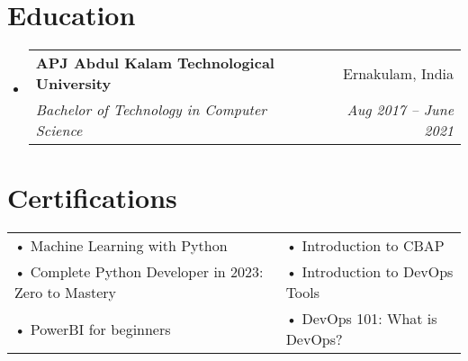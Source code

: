 \documentclass[letterpaper,10pt]{article}
\makeatletter
\newcommand{\resumeItem}[1]{\item\small{#1}}
\newcommand{\resumeSubheading}[4]{
\vspace{-1pt}\item
  \begin{tabular*}{0.97\textwidth}[t]{l@{\extracolsep{\fill}}r}
    \textbf{#1} & #2 \\
    \textit{#3} & \textit{#4} \\
  \end{tabular*}\vspace{-7pt}
}
\newcommand{\resumeSubHeadingList}{\begin{itemize}[leftmargin=0.15in, label={}]}
\newcommand{\resumeSubHeadingListEnd}{\end{itemize}}
\makeatother
\begin{document}
\section{Education}
\resumeSubHeadingList
\resumeSubheading
{APJ Abdul Kalam Technological University}{Ernakulam, India}
{Bachelor of Technology in Computer Science}{Aug 2017 -- June 2021}
\resumeSubHeadingListEnd


\section{Certifications}
\begin{tabular}{p{10cm}p{10cm}}
  • Machine Learning with Python                       & • Introduction to CBAP         \\
  • Complete Python Developer in 2023: Zero to Mastery & • Introduction to DevOps Tools \\
  • PowerBI for beginners                              & • DevOps 101: What is DevOps?  \\
\end{tabular}
\end{document}

